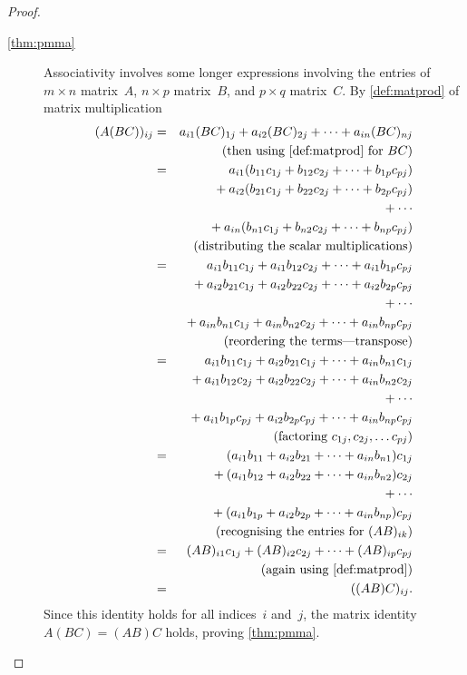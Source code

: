 \begin{proof}
\begin{description}
\item[\ref{thm:pmma}] Associativity involves some longer expressions involving the entries of \(m\times n\) matrix~\(A\), \(n\times p\) matrix~\(B\), and \(p\times q\) matrix~\(C\). 
By \autoref{def:matprod} of matrix multiplication
\begin{eqnarray*}
(A(BC))_{ij}&=& a_{i1}(BC)_{1j}+a_{i2}(BC)_{2j}+\cdots+a_{in}(BC)_{nj}
\\&&\quad(\text{then using  \autoref{def:matprod} for }BC)
\\&=&\phantom{{}+{}}a_{i1}(b_{11}c_{1j}+b_{12}c_{2j}+\cdots+b_{1p}c_{pj})
\\&&{}+a_{i2}(b_{21}c_{1j}+b_{22}c_{2j}+\cdots+b_{2p}c_{pj})
\\&&{}+\cdots
\\&&{}+a_{in}(b_{n1}c_{1j}+b_{n2}c_{2j}+\cdots+b_{np}c_{pj})
\\&&{}\quad(\text{distributing the scalar multiplications})
\\&=&\phantom{{}+{}}a_{i1}b_{11}c_{1j}+a_{i1}b_{12}c_{2j}+\cdots+a_{i1}b_{1p}c_{pj}
\\&&{}+a_{i2}b_{21}c_{1j}+a_{i2}b_{22}c_{2j}+\cdots+a_{i2}b_{2p}c_{pj}
\\&&{}+\cdots
\\&&{}+a_{in}b_{n1}c_{1j}+a_{in}b_{n2}c_{2j}+\cdots+a_{in}b_{np}c_{pj}
\\&&{}\quad(\text{reordering the terms---transpose})
\\&=&\phantom{{}+{}}a_{i1}b_{11}c_{1j}+a_{i2}b_{21}c_{1j}+\cdots+a_{in}b_{n1}c_{1j}
\\&&{}+a_{i1}b_{12}c_{2j}+a_{i2}b_{22}c_{2j}+\cdots+a_{in}b_{n2}c_{2j}
\\&&{}+\cdots
\\&&{}+a_{i1}b_{1p}c_{pj}+a_{i2}b_{2p}c_{pj}+\cdots+a_{in}b_{np}c_{pj}
\\&&{}\quad(\text{factoring }c_{1j},c_{2j},\ldots c_{pj})
\\&=&\phantom{{}+{}}(a_{i1}b_{11}+a_{i2}b_{21}+\cdots+a_{in}b_{n1})c_{1j}
\\&&{}+(a_{i1}b_{12}+a_{i2}b_{22}+\cdots+a_{in}b_{n2})c_{2j}
\\&&{}+\cdots
\\&&{}+(a_{i1}b_{1p}+a_{i2}b_{2p}+\cdots+a_{in}b_{np})c_{pj}
\\&&{}\quad(\text{recognising the entries for }(AB)_{ik})
\\&=&(AB)_{i1}c_{1j} +(AB)_{i2}c_{2j} +\cdots +(AB)_{ip}c_{pj}
\\&&{}\quad(\text{again using  \autoref{def:matprod}})
\\&=&((AB)C)_{ij}.
\end{eqnarray*}
Since this identity holds for all indices~\(i\) and~\(j\), the matrix identity \(A(BC)=(AB)C\) holds, proving \autoref{thm:pmma}.


\end{description}
\end{proof}

